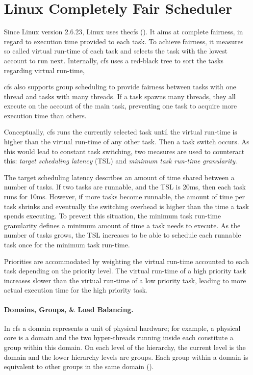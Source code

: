 \section{Linux Completely Fair Scheduler}
\label{state:cfs}


Since Linux version 2.6.23, Linux uses the\gls{cfs} (\cite{linux_cfs_doc}).
It aims at complete fairness, in regard to execution time provided to each task.
To achieve fairness, it measures so called virtual run-time of each task and
selects the task with the lowest account to run next.
Internally, \gls{cfs} uses a red-black tree to sort the tasks regarding virtual
run-time,

\gls{cfs} also supports group scheduling to provide fairness between tasks with one
thread and tasks with many threads.
If a task spawns many threads, they all execute on the account of the main
task, preventing one task to acquire more execution time than others.

Conceptually, \gls{cfs} runs the currently selected task until the virtual run-time is
higher than the virtual run-time of any other task.
Then a task switch occurs.
As this would lead to constant task switching, two measures are used to
counteract this: \emph{target scheduling latency} (TSL) and \emph{minimum task
run-time granularity}.

The target scheduling latency describes an amount of time shared between a
number of tasks.
If two tasks are runnable, and the TSL is 20ms, then each task runs for 10ms.
However, if more tasks become runnable, the amount of time per task shrinks and
eventually the switching overhead is higher than the time a task spends
executing.
To prevent this situation, the minimum task run-time granularity defines a
minimum amount of time a task needs to execute.
As the number of tasks grows, the TSL increases to be able to schedule each
runnable task once for the minimum task run-time.

Priorities are accommodated by weighting the virtual run-time accounted to each
task depending on the priority level.
The virtual run-time of a high priority task increases slower than the virtual
run-time of a low priority task, leading to more actual execution time for the
high priority task.

\paragraph{Domains, Groups, \& Load Balancing.}
In \gls{cfs} a domain represents a unit of physical hardware;
for example, a physical core is a domain and the two hyper-threads running
inside each constitute a group within this domain.
On each level of the hierarchy, the current level is the domain and the lower
hierarchy levels are groups.
Each group within a domain is equivalent to other groups in the same domain
(\cite{lwn_sched_domains}).

